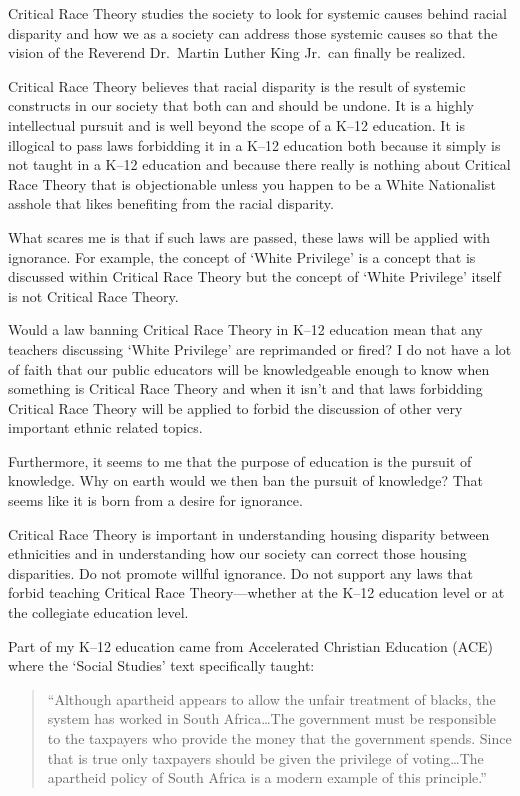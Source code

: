 Critical Race Theory studies the society to look for systemic causes behind racial disparity and how we as a society can address those systemic causes so that the vision of the
Reverend Dr.\ Martin Luther King Jr.\ can finally be realized.

Critical Race Theory believes that racial disparity is the result of systemic constructs in our society that both can and should be undone. It is a highly intellectual pursuit and is well beyond the scope of a K--12 education. It is illogical to pass laws forbidding it in a K--12 education both because it simply is not taught in a K--12 education and because there really is nothing about Critical Race Theory that is objectionable unless you happen to be a White Nationalist asshole that likes benefiting from the racial disparity.

What scares me is that if such laws are passed, these laws will be applied with ignorance. For example, the concept of `White Privilege' is a concept that is discussed within Critical Race Theory but the concept of `White Privilege' itself is not Critical Race Theory.

Would a law banning Critical Race Theory in K--12 education mean that any teachers discussing `White Privilege' are reprimanded or fired? I do not have a lot of faith that our public educators will be knowledgeable enough to know when something is Critical Race Theory and when it isn't and that laws forbidding Critical Race Theory will be applied to forbid the discussion of other very important ethnic related topics.

Furthermore, it seems to me that the purpose of education is the pursuit of knowledge. Why on earth would we then ban the pursuit of knowledge? That seems like it is born from a desire for ignorance.

Critical Race Theory is important in understanding housing disparity between ethnicities and in understanding how our society can correct those housing disparities. Do not promote willful ignorance. Do not support any laws that forbid teaching Critical Race Theory---whether at the K--12 education level or at the collegiate education level.

Part of my K--12 education came from Accelerated Christian Education (ACE) where the `Social Studies' text specifically taught:

\begin{quote}
``Although apartheid appears to allow the unfair treatment of blacks, the system has worked in South Africa\ldots{}The government must be responsible to the taxpayers who provide the money that the government spends. Since that is true only taxpayers should be given the privilege of voting\ldots{}The apartheid policy of South Africa is a modern example of this principle.''
\end{quote}

